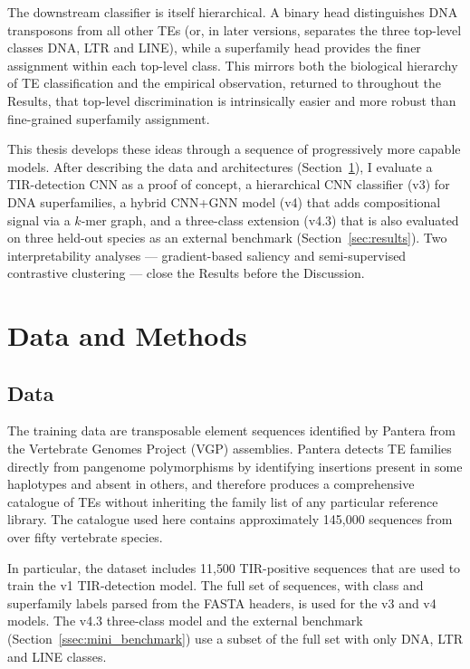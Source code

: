 \documentclass[12pt]{article}
\begin{document}
The downstream classifier is itself hierarchical. A binary head distinguishes DNA transposons from all other TEs (or, in later versions, separates the three top-level classes DNA, LTR and LINE), while a superfamily head provides the finer assignment within each top-level class. This mirrors both the biological hierarchy of TE classification and the empirical observation, returned to throughout the Results, that top-level discrimination is intrinsically easier and more robust than fine-grained superfamily assignment.

This thesis develops these ideas through a sequence of progressively more capable models. After describing the data and architectures (Section~\ref{sec:methods}), I evaluate a TIR-detection CNN as a proof of concept, a hierarchical CNN classifier (v3) for DNA superfamilies, a hybrid CNN+GNN model (v4) that adds compositional signal via a $k$-mer graph, and a three-class extension (v4.3) that is also evaluated on three held-out species as an external benchmark (Section~\ref{sec:results}). Two interpretability analyses --- gradient-based saliency and semi-supervised contrastive clustering --- close the Results before the Discussion.

\newpage
\section{Data and Methods}\label{sec:methods}

\subsection{Data}\label{ssec:data}

The training data are transposable element sequences identified by Pantera \cite{sierra2024pantera} from the Vertebrate Genomes Project (VGP) assemblies. Pantera detects TE families directly from pangenome polymorphisms by identifying insertions present in some haplotypes and absent in others, and therefore produces a comprehensive catalogue of TEs without inheriting the family list of any particular reference library. The catalogue used here contains approximately 145{,}000 sequences from over fifty vertebrate species. 

In particular, the dataset includes 11{,}500 TIR-positive sequences that are used to train the v1 TIR-detection model. The full set of sequences, with class and superfamily labels parsed from the FASTA headers, is used for the v3 and v4 models. The v4.3 three-class model and the external benchmark (Section~\ref{ssec:mini_benchmark}) use a subset of the full set with only DNA, LTR and LINE classes. 
\end{document}
